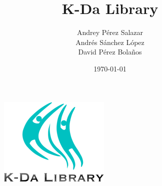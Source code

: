 \documentclass{beamer}
\begin{document}
\title[K-Da Library]{K-Da Library} %
%
\author{Andrey Pérez Salazar\\ Andrés Sánchez López\\ David Pérez Bolaños} %
\date{\today} %

\begin{frame}


\begin{figure}
\includegraphics[width=0.46\linewidth]{logo.jpg}
\end{figure}


\end{frame}
\end{document}
